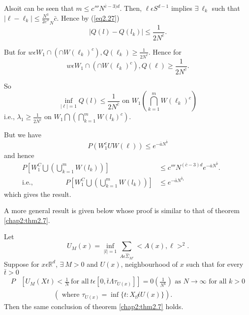 Also\pageoriginale it can be seen that $m \leq c'''N^{\bar{c}-3)d}$. Then, $\ell
\epsilon  S^{d-1}$ implies $\exists~ \ell_k$ such that $|\ell-\ell_k|
\leq \frac{N^3}{2c''}_N \bar{c}$. Hence by (\ref{eq2.27})
\begin{equation*}
  |Q(l)-Q(l_k) | \leq \frac{1}{2N^{\bar{c}}}. 
\end{equation*}

But for $w \epsilon  W_1 \cap (\cap W(\ell_k)^c), Q(\ell_k) \geq
\frac{1}{2N^{\bar{c}}}$. Hence for
$$
w \epsilon  W_1 \cap (\cap W(\ell_k )^c), Q(\ell) \geq
\frac{1}{2N^{\bar{c}}}. 
$$

So 
$$
\inf_{|\ell|=1} Q(l) \leq \frac{1}{2N^{\bar{c}}} \text{ on } W_1
\left(\bigcap^m_{k=1} W(\ell_k)^c\right) 
$$
i.e.,  \qquad $\lambda_1 \geq \frac{1}{2N^{\bar{c}}} $ on $ W_1
\bigcap \left(\bigcap^m_{k=1} W(l_k)^c\right)$. 

But we have 
$$
P(W^c_1 U W (\ell)) \leq e^{-{\bar{a}}N^{\bar{b}}}
$$
and hence
\begin{align*}
  P \left[W^C_1  \bigcup \left(\bigcup^m_{k=1} W(l_k)\right)\right] &\leq c'''
  N^{(\bar{c}-3)d} e^{-\bar{a}N^{\bar{b}}}.\\
  \text{i.e.,}\hspace{2cm}  P \left[ W^C_1  \bigcup \left(\bigcup^m_{k=1}
    W(l_k)\right)\right] & \leq e^{-\bar{a}N^{\bar{b}_1}}\hspace{3cm}
\end{align*}
which gives the result.

A more general result is given below whose proof is similar to that of
theorem \ref{chap2:thm2.7}. 

\begin{theorem}%
  Let\pageoriginale 
  $$
  U_M(x) = \inf_{|l|=1} \sum_{ A \epsilon  \hat{\Sigma}_{M'}} < A(x),
  \ell >^2. 
  $$
Suppose for $x \epsilon  \mathbb{R}^d$, $\exists~ M>0$ and $U(x)$,
neighbourhood of $x$ such that for every $\bar{t}>0$ 
{\fontsize{10pt}{12pt}\selectfont
\begin{align*}
  P & \left[U_M(Xt) < \frac{1}{N} ~\text{for all}~ t \epsilon  [0,
      \bar{t}  \Lambda \tau_{U(x)}] \right]
   = 0 \left(\frac{1}{N^k}\right) \text{ as } N \to \infty \text{ for
     all } k > 0\\
  &\hspace{2cm}(\text{ where } \tau_{U(x)}= \inf \{ t: X_t
   \not\epsilon U(x)\}).  
\end{align*}}\relax
Then the same conclusion of theorem \ref{chap2:thm2.7} holds.
\end{theorem}


